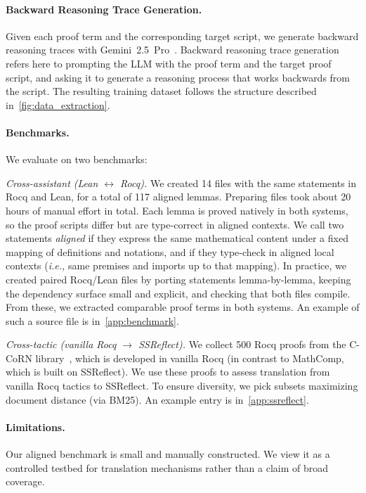 \documentclass{article}
\theoremstyle{plain}
\theoremstyle{definition}
\theoremstyle{remark}
\newcommand{\ie}{\emph{i.e.,}\xspace}
\begin{document}
	\paragraph{Backward Reasoning Trace Generation.}
	Given each proof term and the corresponding target script, we generate backward reasoning traces with Gemini~2.5~Pro~\cite{gemini2024}. Backward reasoning trace generation refers here to prompting the LLM with the proof term and the target proof script, and asking it to generate a reasoning process that works backwards from the script. The resulting training dataset follows the structure described in~\cref{fig:data_extraction}.
	
	\paragraph{Benchmarks.}
	\label{benchmarks}
	We evaluate on two benchmarks:
	
	\emph{Cross-assistant (Lean \texorpdfstring{$\leftrightarrow$}{<->} Rocq).}
	We created 14 files with the same statements in Rocq and Lean, for a total of 117 aligned lemmas. Preparing files took about 20 hours of manual effort in total. Each lemma is proved natively in both systems, so the proof scripts differ but are type-correct in aligned contexts.
	We call two statements \emph{aligned} if they express the same mathematical content under a fixed mapping of definitions and notations, and if they type-check in aligned local contexts (\ie same premises and imports up to that mapping).
	In practice, we created paired Rocq/Lean files by porting statements lemma-by-lemma, keeping the dependency surface small and explicit, and checking that both files compile.
	From these, we extracted comparable proof terms in both systems. An example of such a source file is in~\cref{app:benchmark}.
	
	\emph{Cross-tactic (vanilla Rocq \texorpdfstring{$\to$}{->} SSReflect).}
	We collect 500 Rocq proofs from the C-CoRN library~\cite{corn}, which is developed in vanilla Rocq (in contrast to MathComp, which is built on SSReflect). We use these proofs to assess translation from vanilla Rocq tactics to SSReflect. To ensure diversity, we pick subsets maximizing document distance (via BM25). An example entry is in~\cref{app:ssreflect}.
	
	\paragraph{Limitations.}
	Our aligned benchmark is small and manually constructed. We view it as a controlled testbed for translation mechanisms rather than a claim of broad coverage.
	
\end{document}
